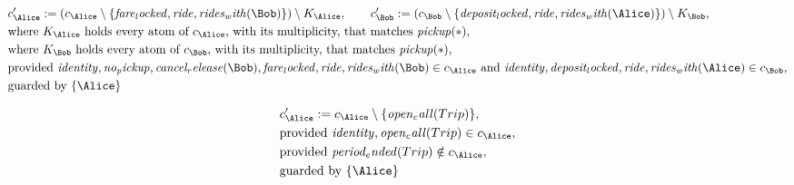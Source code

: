 \begin{align*}
&
c'_
{
\Alice
}
 := 
(c_
{
\Alice
}
 \setminus 
\{
\mathit{
fare_locked
}
,
\mathit{
ride
}
,
\mathit{
rides_with
}
(
\Bob
)
\}
) \setminus K_
{
\Alice
}
, \qquad 
c'_
{
\Bob
}
 := 
(c_
{
\Bob
}
 \setminus 
\{
\mathit{
deposit_locked
}
,
\mathit{
ride
}
,
\mathit{
rides_with
}
(
\Alice
)
\}
) \setminus K_
{
\Bob
}
,\\
&
\text{where } K_
{
\Alice
}
 \text{ holds every atom of } c_
{
\Alice
}
 \text{, with its multiplicity, that matches } 
\mathit{
pickup
}
(
\ast
)
,\\
&
\text{where } K_
{
\Bob
}
 \text{ holds every atom of } c_
{
\Bob
}
 \text{, with its multiplicity, that matches } 
\mathit{
pickup
}
(
\ast
)
,\\
&
\text{provided } 
\mathit{
identity
}
,
\mathit{
no_pickup
}
,
\mathit{
cancel_release
}
(
\Bob
)
,
\mathit{
fare_locked
}
,
\mathit{
ride
}
,
\mathit{
rides_with
}
(
\Bob
)
 \in c_
{
\Alice
}
 \text{ and } 
\mathit{
identity
}
,
\mathit{
deposit_locked
}
,
\mathit{
ride
}
,
\mathit{
rides_with
}
(
\Alice
)
 \in c_
{
\Bob
}
,\\
&
\text{guarded by } \{
\Alice
\}
\end{align*}

\begin{align*}
&
c'_
{
\Alice
}
 := 
c_
{
\Alice
}
 \setminus 
\{
\mathit{
open_call
}
(
Trip
)
\}
,\\
&
\text{provided } 
\mathit{
identity
}
,
\mathit{
open_call
}
(
Trip
)
 \in c_
{
\Alice
}
,\\
&
\text{provided } 
\mathit{
period_ended
}
(
Trip
)
 \notin c_
{
\Alice
}
,\\
&
\text{guarded by } \{
\Alice
\}
\end{align*}
